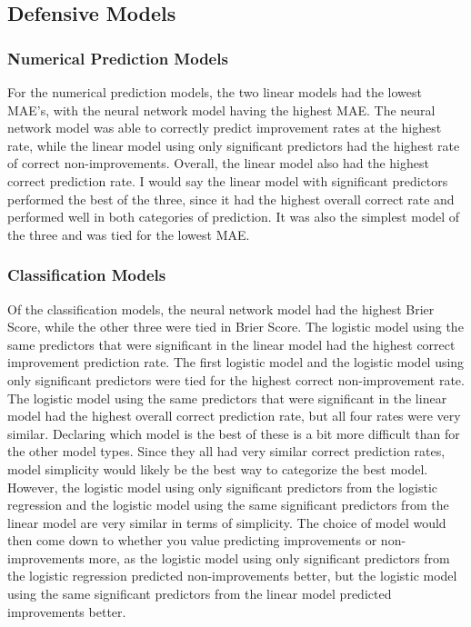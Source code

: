\documentclass[12pt]{article}
\begin{document}
\subsection{Defensive Models}
\label{subsec:def-results}
\subsubsection{Numerical Prediction Models}
\label{subsubsec:npdef-results}
For the numerical prediction models, the two linear models had the lowest MAE's, with the neural network model having the highest MAE. The neural network model was able to correctly predict improvement rates at the highest rate, while the linear model using only significant predictors had the highest rate of correct non-improvements. Overall, the linear model also had the highest correct prediction rate. I would say the linear model with significant predictors performed the best of the three, since it had the highest overall correct rate and performed well in both categories of prediction. It was also the simplest model of the three and was tied for the lowest MAE. 
\subsubsection{Classification Models}
\label{subsubsec:classdef-results}
Of the classification models, the neural network model had the highest Brier Score, while the other three were tied in Brier Score. The logistic model using the same predictors that were significant in the linear model had the highest correct improvement prediction rate. The first logistic model and the logistic model using only significant predictors were tied for the highest correct non-improvement rate. The logistic model using the same predictors that were significant in the linear model had the highest overall correct prediction rate, but all four rates were very similar. Declaring which model is the best of these is a bit more difficult than for the other model types. Since they all had very similar correct prediction rates, model simplicity would likely be the best way to categorize the best model. However, the logistic model using only significant predictors from the logistic regression and the logistic model using the same significant predictors from the linear model are very similar in terms of simplicity. The choice of model would then come down to whether you value predicting improvements or non-improvements more, as the logistic model using only significant predictors from the logistic regression predicted non-improvements better, but the logistic model using the same significant predictors from the linear model predicted improvements better.
\end{document}
